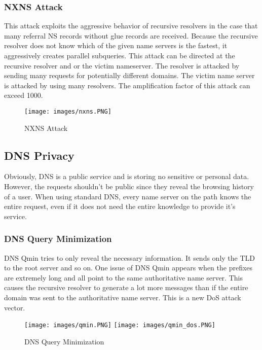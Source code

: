 \subsubsection{NXNS Attack}
This attack exploits the aggressive behavior of recursive resolvers in the case that many referral NS records without glue records are received. Because the recursive resolver does not know which of the given name servers is the fastest, it aggressively creates parallel subqueries. This attack can be directed at the recursive resolver and or the victim nameserver. The resolver is attacked by sending many requests for potentially different domains. The victim name server is attacked by using many resolvers. The amplification factor of this attack can exceed 1000.
\begin{figure}[H]
\centering
\texttt{[image: images/nxns.PNG]}
\caption{NXNS Attack}
\label{nxns}
\end{figure}

\subsection{DNS Privacy}
Obviously, DNS is a public service and is storing no sensitive or personal data. However, the requests shouldn't be public since they reveal the browsing history of a user. When using standard DNS, every name server on the path knows the entire request, even if it does not need the entire knowledge to provide it's service.

\subsubsection{DNS Query Minimization}
DNS Qmin tries to only reveal the necessary information. It sends only the TLD to the root server and so on. 
One issue of DNS Qmin appears when the prefixes are extremely long and all point to the same authoritative name server. This causes the recursive resolver to generate a lot more messages than if the entire domain was sent to the authoritative name server. This is a new DoS attack vector.
\begin{figure}[H]
\centering
\texttt{[image: images/qmin.PNG]}
\texttt{[image: images/qmin\_dos.PNG]}
\caption{DNS Query Minimization}
\label{qmin}
\end{figure}

